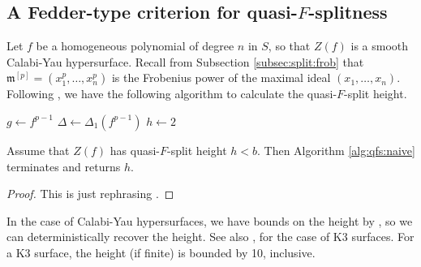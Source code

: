 \subsection{A Fedder-type criterion for quasi-\(F\)-splitness}

Let \(f\) be a homogeneous polynomial of degree \(n\)
in \(S\),
so that \(Z(f)\) is a smooth Calabi-Yau hypersurface.
Recall from Subsection \ref{subsec:split:frob} that
\(\mathfrak{m}^{[p]} = (x_{1}^{p}, \ldots, x_{n}^{p})\)
is the Frobenius power of the maximal ideal \((x_1, \ldots, x_n)\).
Following \cite{kty-2022-fedder}, we have the following
algorithm to calculate the quasi-\(F\)-split height.

\begin{algorithm}[H]
\caption{Quasi-\(F\)-split height: naive algorithm}
\label{alg:qfs:naive}
$g \gets f^{p - 1}$\;
$\Delta \gets \Delta_1(f^{p-1})$\;
$h \gets 2$\;
\end{algorithm}

\begin{thm}
	Assume that
	\(Z(f)\) has quasi-\(F\)-split height \(h < b\).
	Then Algorithm \ref{alg:qfs:naive} terminates
	and returns \(h\).
\end{thm}

\begin{proof}
	This is just rephrasing \cite[Theorem~C]{kty-2022-fedder}.
\end{proof}

In the case of Calabi-Yau hypersurfaces, we have bounds on the height by
\cite{van-der-geer-katsura-2003-calabi-yau},
so we can deterministically recover the height.
See also \cite[Theorem~0.1]{artin-1974-k3-surfaces},
for the case of K3 surfaces.
For a K3 surface, the height (if finite) is bounded by 10, inclusive.

